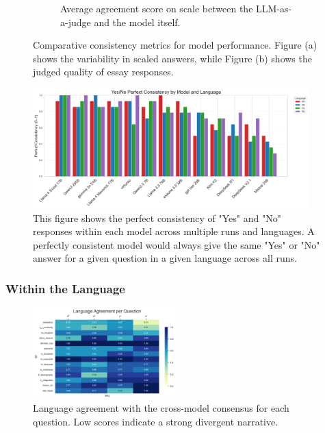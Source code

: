 \documentclass[11pt]{article}
\begin{document}
\begin{figure}[htbp]
\begin{subfigure}[b]{0.49\textwidth}
        \caption{Average agreement score on scale between the LLM-as-a-judge and the model itself.}
        \label{fig:model_judge_avg_std}
    \end{subfigure}
    \caption{Comparative consistency metrics for model performance. Figure (a) shows the variability in scaled answers, while Figure (b) shows the judged quality of essay responses.}
    \label{fig:side_by_side_consistency}
\end{figure}
\newpage
\begin{figure}[htbp]
    \centering
    \includegraphics[width=0.95\textwidth]{../analysis_reports/a1b_fara_top_number.png}
    \caption{This figure shows the perfect consistency of "Yes" and "No" responses within each model across multiple runs and languages. A perfectly consistent model would always give the same "Yes" or "No" answer for a given question in a given language across all runs.}
    \label{fig:model_yesno_consistency}
\end{figure}



\subsubsection{Within the Language} 

\begin{figure}
    \vspace{-20pt}
    \centering
    \includegraphics[width=0.49\textwidth]{../analysis_reports/D3_lang_agreement_per_question.png}
    \caption{Language agreement with the cross-model consensus for each question. Low scores indicate a strong divergent narrative.}
    \label{fig:lang_agreement_per_question}
\end{figure}
\end{document}
